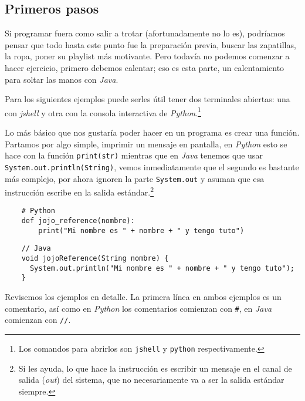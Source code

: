 \subsection{Primeros pasos}
  Si programar fuera como salir a trotar (afortunadamente no lo es), podríamos pensar que todo hasta
  este punto fue la preparación previa, buscar las zapatillas, la ropa, poner su playlist más 
  motivante.
  Pero todavía no podemos comenzar a hacer ejercicio, primero debemos calentar; eso es esta parte, 
  un calentamiento para soltar las manos con \textit{Java}.

  Para los siguientes ejemplos puede serles útil tener dos terminales abiertas: una con 
  \textit{jshell} y otra con la consola interactiva de \textit{Python}.\footnote{Los comandos para 
  abrirlos son \texttt{jshell} y \texttt{python} respectivamente.}

  Lo más básico que nos gustaría poder hacer en un programa es crear una función.
  Partamos por algo simple, imprimir un mensaje en pantalla, en \textit{Python} esto se hace con la 
  función \texttt{print(str)} mientras que en \textit{Java} tenemos que usar 
  \texttt{System.out.println(String)}, vemos inmediatamente que el segundo es bastante más
  complejo, por ahora ignoren la parte \texttt{System.out} y asuman que esa instrucción 
  escribe en la salida estándar.\footnote{Si les ayuda, lo que hace la instrucción es escribir un 
  mensaje en el canal de salida (\textit{out}) del sistema, que no necesariamente va a ser la salida
  estándar siempre.}

  \begin{verbatim}
    # Python
    def jojo_reference(nombre):
        print("Mi nombre es " + nombre + " y tengo tuto")
  \end{verbatim}

  \begin{verbatim}
    // Java
    void jojoReference(String nombre) {
      System.out.println("Mi nombre es " + nombre + " y tengo tuto");
    }
  \end{verbatim}

  Revisemos los ejemplos en detalle.
  La primera línea en ambos ejemplos es un comentario, así como en \textit{Python} los comentarios
  comienzan con \texttt{#}, en \textit{Java} comienzan con \texttt{//}.

